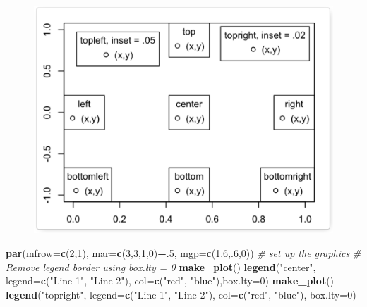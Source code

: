 \documentclass[]{book}
\newenvironment{Shaded}{\begin{snugshade}}{\end{snugshade}}
\newcommand{\KeywordTok}[1]{\textcolor[rgb]{0.13,0.29,0.53}{\textbf{#1}}}
\newcommand{\DataTypeTok}[1]{\textcolor[rgb]{0.13,0.29,0.53}{#1}}
\newcommand{\DecValTok}[1]{\textcolor[rgb]{0.00,0.00,0.81}{#1}}
\newcommand{\FloatTok}[1]{\textcolor[rgb]{0.00,0.00,0.81}{#1}}
\newcommand{\StringTok}[1]{\textcolor[rgb]{0.31,0.60,0.02}{#1}}
\newcommand{\CommentTok}[1]{\textcolor[rgb]{0.56,0.35,0.01}{\textit{#1}}}
\newcommand{\OperatorTok}[1]{\textcolor[rgb]{0.81,0.36,0.00}{\textbf{#1}}}
\newcommand{\NormalTok}[1]{#1}
\begin{document}
\begin{figure}
\centering
\includegraphics{2.PNG}
\caption{}
\end{figure}

\begin{Shaded}
\begin{Highlighting}[]
\KeywordTok{par}\NormalTok{(}\DataTypeTok{mfrow=}\KeywordTok{c}\NormalTok{(}\DecValTok{2}\NormalTok{,}\DecValTok{1}\NormalTok{), }\DataTypeTok{mar=}\KeywordTok{c}\NormalTok{(}\DecValTok{3}\NormalTok{,}\DecValTok{3}\NormalTok{,}\DecValTok{1}\NormalTok{,}\DecValTok{0}\NormalTok{)}\OperatorTok{+}\NormalTok{.}\DecValTok{5}\NormalTok{, }\DataTypeTok{mgp=}\KeywordTok{c}\NormalTok{(}\FloatTok{1.6}\NormalTok{,.}\DecValTok{6}\NormalTok{,}\DecValTok{0}\NormalTok{))  }\CommentTok{# set up the graphics}
\CommentTok{# Remove legend border using box.lty = 0}
\KeywordTok{make_plot}\NormalTok{()}
\KeywordTok{legend}\NormalTok{(}\StringTok{"center"}\NormalTok{, }\DataTypeTok{legend=}\KeywordTok{c}\NormalTok{(}\StringTok{"Line 1"}\NormalTok{, }\StringTok{"Line 2"}\NormalTok{),}
       \DataTypeTok{col=}\KeywordTok{c}\NormalTok{(}\StringTok{"red"}\NormalTok{, }\StringTok{"blue"}\NormalTok{),}\DataTypeTok{box.lty=}\DecValTok{0}\NormalTok{)}
\KeywordTok{make_plot}\NormalTok{()}
\KeywordTok{legend}\NormalTok{(}\StringTok{"topright"}\NormalTok{, }\DataTypeTok{legend=}\KeywordTok{c}\NormalTok{(}\StringTok{"Line 1"}\NormalTok{, }\StringTok{"Line 2"}\NormalTok{),}
       \DataTypeTok{col=}\KeywordTok{c}\NormalTok{(}\StringTok{"red"}\NormalTok{, }\StringTok{"blue"}\NormalTok{),}
       \DataTypeTok{box.lty=}\DecValTok{0}\NormalTok{)}
\end{Highlighting}
\end{Shaded}
\end{document}
